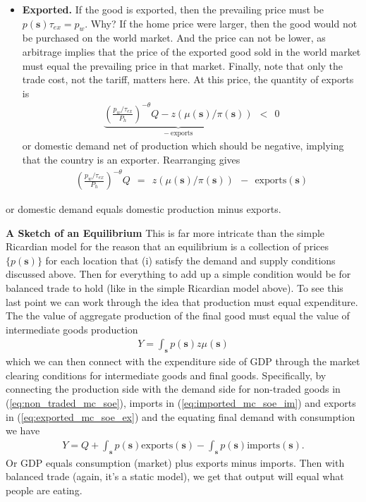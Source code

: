 \documentclass[pdftex,12pt]{article}
\begin{document}
\begin{itemize}
\item \textbf{Exported.} If the good is exported, then the prevailing price must be $p(\textbf{s})\tau_{ex} = p_w$. Why? If the home price were larger, then the good would not be purchased on the world market. And the price can not be lower, as arbitrage implies that the price of the exported good sold in the world market must equal the prevailing price in that market. Finally, note that only the trade cost, not the tariff, matters here. At this price, the quantity of exports is
    \begin{align}
 \underbrace{  \left(\frac{p_w/\tau_{ex}}{P_h}\right)^{-\theta}Q- z\left( \mu(\textbf{s}) / \pi(\textbf{s})\right)}_{- \ \mbox{exports}} \ \ < \ \ 0
 \label{eq:exported_mc_soe}
    \end{align}
    or domestic demand net of production which should be negative, implying that the country is an exporter. Rearranging gives
    \begin{align}
 \left(\frac{p_w/\tau_{ex}}{P_h}\right)^{-\theta}Q \ \ = \ \  z\left( \mu(\textbf{s}) / \pi(\textbf{s})\right)  \ \ - \ \  \mbox{exports}(\textbf{s})
 \label{eq:exported_mc_soe_ex}
    \end{align}
\end{itemize}
or domestic demand equals domestic production minus exports.

\medskip
\noindent \textbf{A Sketch of an Equilibrium} This is far more intricate than the simple Ricardian model for the reason that an equilibrium is a collection of prices $\{ p(\textbf{s})\}$ for each location that (i) satisfy the demand and supply conditions discussed above. Then for everything to add up a simple condition would be for balanced trade to hold (like in the simple Ricardian model above). To see this last point we can work through the idea that production must equal expenditure. The the value of aggregate production of the final good must equal the value of intermediate goods production
\begin{align}
    Y = \int_{\textbf{s}} p(\textbf{s})z \mu(\textbf{s})
\end{align}
which we can then connect with the expenditure side of GDP through the market clearing conditions for intermediate goods and final goods. Specifically, by connecting the production side with the demand side for non-traded goods in (\ref{eq:non_traded_mc_soe}), imports in (\ref{eq:imported_mc_soe_im}) and exports in  (\ref{eq:exported_mc_soe_ex}) and the equating final demand with consumption we have
\begin{align}
    Y = Q +  \int_{\textbf{s}}p(\textbf{s})\mbox{exports}(\textbf{s}) - \int_{\textbf{s}}p(\textbf{s})\mbox{imports}(\textbf{s}).
\label{eq:production_side_gdp}
\end{align}
Or GDP equals consumption (market) plus exports minus imports. Then with balanced trade (again, it's a static model), we get that output will equal what people are eating. 
\end{document}
